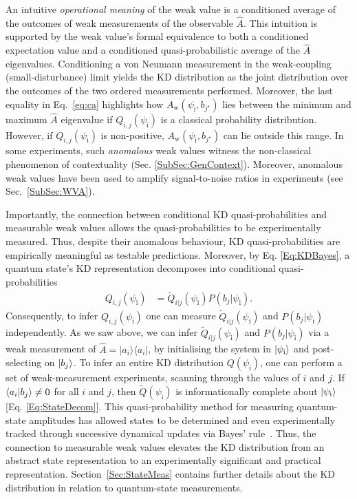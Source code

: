 \documentclass[%
 reprint,
superscriptaddress,
nofootinbib,
bibnotes,
 amsmath,amssymb,
 aps,
]{revtex4-1}
\theoremstyle{plain}
\newcommand*{\ketbra}[2]{\lvert #1 \rangle\!\langle #2 \rvert}
\begin{document}
An intuitive \emph{operational meaning} of the  weak value is a conditioned average of the outcomes of weak measurements 
of the observable $\hat{A}$. This intuition is supported by the weak value's formal equivalence to both a conditioned expectation value and a conditioned quasi-probabilistic average of the $\hat{A}$ eigenvalues. Conditioning a von Neumann measurement in the weak-coupling (small-disturbance) limit yields  the KD distribution as the  joint distribution over the outcomes of
the two ordered 
measurements performed. Moreover,  the last equality in Eq.~\eqref{eq:ca} highlights how $A_{\mathrm{w}}(\psi_{\mathrm{i}},b_{j^{\star}}) $ lies between the minimum and maximum $\hat{A}$ eigenvalue if $Q_{i,j}(\psi_{\mathrm{i}})$ is a classical probability distribution. However,  if $Q_{i,j}(\psi_{\mathrm{i}})$ is non-positive, $A_{\mathrm{w}}(\psi_{\mathrm{i}},b_{j^{\star}}) $ can lie outside this range.  In some experiments, such \textit{anomalous} weak values  witness the non-classical phenomenon of contextuality (Sec. \ref{SubSec:GenContext}).
Moreover, anomalous weak values have  been used  to amplify signal-to-noise ratios in experiments (see Sec.~\ref{SubSec:WVA}).


Importantly, the connection between conditional KD quasi-probabilities and measurable weak values allows the quasi-probabilities to be experimentally measured. Thus, despite their anomalous behaviour, KD quasi-probabilities are empirically meaningful as testable predictions. Moreover,  by Eq. \eqref{Eq:KDBayes},  a quantum state's KD representation decomposes into conditional quasi-probabilities
\begin{align}
    Q_{i,j}(\psi_{\mathrm{i}}) &= \tilde{Q}_{i|j}(\psi_{\mathrm{i}}) P(b_j|\psi_{\mathrm{i}}).
\end{align}
Consequently, to infer 
$Q_{i,j}(\psi_{\mathrm{i}})$ one can measure $\tilde{Q}_{i|j}(\psi_{\mathrm{i}}) $ and $P(b_j|\psi_{\mathrm{i}})$ independently. 
As we saw above, we can infer $\tilde{Q}_{i|j}(\psi_{\mathrm{i}}) $ and $P(b_j|\psi_{\mathrm{i}})$ via a weak measurement of $\hat{A}=\ketbra{a_i}{a_i}$, by initialising the system in $\ket{\psi_{\mathrm{i}}}$ and post-selecting on $\ket{b_j}$. To infer an entire KD distribution ${Q}(\psi_{\mathrm{i}}) $, one can perform a set of weak-measurement experiments, scanning through the values of $i$ and $j$. If $\braket{a_i|b_j}\neq 0$ for all $i$ and $j$, then $\tilde{Q}(\psi_{\mathrm{i}}) $ is informationally complete about $\ket{\psi_{\mathrm{i}}}$ [Eq. \ref{Eq:StateDecom}].
This quasi-probability method for  
measuring quantum-state amplitudes has allowed states to be determined and even experimentally tracked through successive dynamical updates via Bayes' rule~\cite{Bamber2014}. Thus, the connection to measurable weak values elevates the KD distribution from an abstract state representation to an experimentally significant and practical representation. Section~\ref{Sec:StateMeas} contains further details about the KD distribution in relation to quantum-state measurements.
\end{document}
